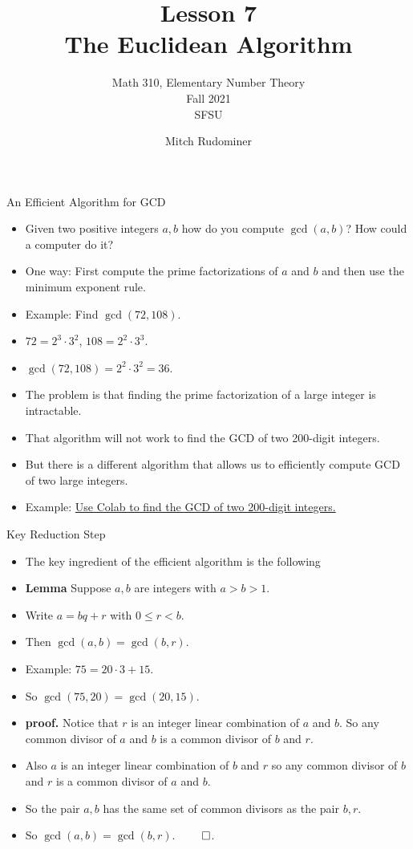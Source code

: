 \documentclass[handout]{beamer}
\title{Lesson 7 \\ The Euclidean Algorithm}
\subtitle{Math 310, Elementary Number Theory \\ Fall 2021 \\ SFSU}
\author{Mitch Rudominer}
\date{}
\begin{document}
\begin{frame}
  \titlepage
\end{frame}

\begin{frame}{An Efficient Algorithm for GCD}

\begin{itemize}
  \item Given two positive integers $a,b$ how do you compute $\gcd(a,b)$? How could a computer do it?
  \item One way: First compute the prime factorizations of $a$ and $b$ and then use the minimum exponent rule.
  \item Example: Find $\gcd(72, 108)$.
  \item $72=2^3\cdot 3^2$, $108=2^2\cdot 3^3$.
  \item $\gcd(72,108) = 2^2\cdot 3^2 = 36$.
  \item The problem is that finding the prime factorization of a large integer is intractable.
  \item That algorithm will not work to find the GCD of two 200-digit integers.
  \item But there is a different algorithm that allows us to efficiently compute GCD of two large integers.
  \item Example: \href{https://colab.research.google.com/drive/1itrO4ePMS6PxUmBhbTBumrgoafyIglD7}{Use Colab to find the GCD of two 200-digit integers.}
\end{itemize}

\end{frame}

\begin{frame}{Key Reduction Step}

\begin{itemize}
  \item The key ingredient of the efficient algorithm is the following
  \item \textbf{Lemma} Suppose $a,b$ are integers with $a>b>1$.
  \item Write $a = bq + r$ with $0\leq r < b$.
  \item Then $\gcd(a,b) = \gcd(b,r)$.
  \item Example: $75 = 20\cdot 3 + 15$.
  \item So $\gcd(75, 20) = \gcd(20, 15)$.
  \item \textbf{proof.} Notice that $r$ is an integer linear combination of
  $a$ and $b$. So any common divisor of $a$ and $b$ is a common divisor of $b$ and $r$.
  \item Also $a$ is an integer linear combination of $b$ and $r$ so any common divisor
  of $b$ and $r$ is a common divisor of $a$ and $b$.
  \item So the pair $a,b$ has the same set of common divisors as the pair $b,r$.
  \item So $\gcd(a,b)=\gcd(b,r)$. $\qed$.
\end{itemize}

\end{frame}
\end{document}
